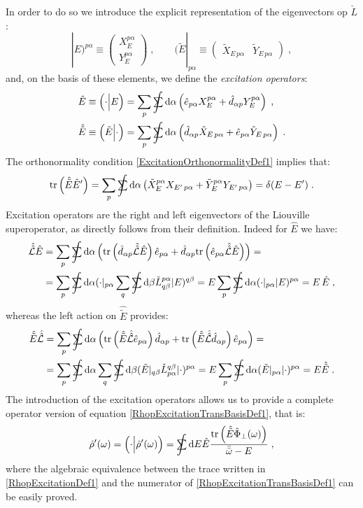 \documentclass[a4paper]{article}
\newcommand{\dd}{{\rm d}}
\newcommand{\bomega}{\bar\omega}
\newcommand{\bbomega}{\bar{\bomega}}
\newcommand{\sint}{\mathrlap{\displaystyle\int}
\mathrlap{\textstyle\sum}
\phantom{\mathrlap{\displaystyle
\int}\textstyle\sum}}
\newcommand{\be}{\begin{equation}}
\newcommand{\ee}{\end{equation}}
\newcommand{\nn}{\notag}
\newcommand{\qq}{\qquad}
\newcommand{\lb}{\label}
\newcommand{\mat}[1]{\begin{pmatrix} #1\end{pmatrix}}
\newcommand{\op}[1]{\hat {#1}}
\newcommand{\sop}[1]{\op{\op {#1}}}
\newcommand{\trace}[1]{\mathrm{tr}\left(#1\right)}
\newcommand{\optr}[1]{\check #1}
\newcommand{\opskew}[1]{{\op {#1}}_{\perp}}
\newcommand{\sket}[2]{| #2)^{#1}}
\newcommand{\sbra}[2]{( #2|_{#1}}
\newcommand{\dbraket}[2]{\Bigl(#1 \Bigl| #2 \Bigr)}
\newcommand{\dm}{\op{\rho}}
\newcommand{\excite}[2]{\op e_{{#1}{#2}}}
\newcommand{\decay}[2]{\op d_{{#1}{#2}}}
\newcommand{\Liouv}{\sop{\mathcal L}}
\begin{document}
In order to do so we introduce the explicit representation of the eigenvectors op $\optr{L}$:
\be\lb{XYcoeffDef1}
\sket{p\alpha}{E} \equiv \mat{X_E^{p\alpha} \\ Y_E^{p\alpha}} \;, \qq
\sbra{p\alpha}{\tilde E} \equiv \mat{\tilde X_{E\,p\alpha} & \tilde Y_{E\,p\alpha}} \;,
\ee
and, on the basis of these elements, we define the \emph{excitation operators}:
\begin{align}\lb{ExctitationOperatorsDef1}
\op E &\equiv \dbraket{\cdot}{E} = 
\sum_p \sint \dd \alpha \left(\excite{p}{\alpha} X_E^{p\alpha} + \decay{\alpha}{p} Y_E^{p\alpha}\right) 
\;,\nn \\
\op{\tilde E} &\equiv \dbraket{\tilde E}{\cdot} = \sum_p \sint \dd \alpha \left(\decay{\alpha}{p} \tilde X_{E\,p\alpha} + 
\excite{p}{\alpha}\tilde Y_{E\,p\alpha}  \right)\;.
\end{align}
The orthonormality condition \eqref{ExcitationOrthonormalityDef1} implies that:
\be
\trace{\op{\tilde E} \op E'} = \sum_p\sint \dd\alpha \left(\tilde X_E^{p\alpha} X_{E'\,p\alpha} +
\tilde Y_E^{p\alpha} Y_{E'\,p\alpha}\right) = \delta(E-E') \;. 
\ee
Excitation operators are the right and left eigenvectors of the Liouville superoperator, as directly follows from their
definition. Indeed for $\op E$ we have:
\begin{align}\lb{opEeigenvalueDef1}
\Liouv \op E & = \sum_p \sint \dd \alpha \left(\trace{\decay{\alpha}{p} \Liouv \op E} \excite{p}{\alpha} + 
\decay{\alpha}{p} \trace{ \excite{p}{\alpha} \Liouv \op E}  \right) = \nn \\
&= \sum_p \sint  \dd \alpha \sbra{p\alpha}{\cdot} \sum_q \sint  \dd \beta \optr{L}^{p \alpha}_{q\beta} \sket{q\beta}{E} 
= E \sum_p \sint \dd \alpha \sbra{p\alpha}{\cdot} \sket{p\alpha}{E} = E \, \op E \;,	
\end{align}
whereas the left action on $\op{\tilde E}$ provides:
\begin{align}\lb{optildeEeigenvalueDef1}
 \op{\tilde E} \Liouv &=  \sum_p \sint \dd \alpha \left(
\trace{\op{\tilde E}\Liouv\excite{p}{\alpha}}\decay{\alpha}{p} +  
\trace{\op{\tilde E}\sop{\mathcal L}\decay{\alpha}{p}} \excite{p}{\alpha} \right) = 
\nn \\ &= \sum_p \sint  \dd \alpha  \sum_q \sint  \dd \beta
\sbra{q\beta}{\tilde E}\optr{L}^{q\beta}_{p\alpha}\sket{p\alpha}{\cdot} = 
E\sum_p \sint \dd \alpha \sbra{p\alpha}{\tilde E} \sket{p\alpha}{\cdot}  =
E \op{\tilde E} \;.
\end{align}
The introduction of the excitation operators allows us to provide a complete operator version of equation \eqref{RhopExcitationTransBasisDef1}, that is:
\be\lb{RhopExcitationDef1}
\dm'(\omega) = \dbraket{\cdot}{\dm'(\omega)} =
\sint\dd E \op E
\frac{\trace{\op{\tilde E}\opskew{\Phi}(\omega)}}{\bbomega-E} \;,
\ee
where the algebraic equivalence between the trace written in \eqref{RhopExcitationDef1} and the numerator of \eqref{RhopExcitationTransBasisDef1}
can be easily proved.
\end{document}
